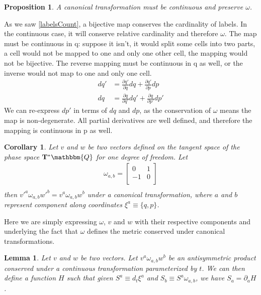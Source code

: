 \documentclass[aps,pra,10pt,twocolumn,floatfix,nofootinbib]{revtex4-1}
\newtheorem{cor}[thm]{Corollary}
\newtheorem{lem}[thm]{Lemma}
\newtheorem{prop}[thm]{Proposition}
\theoremstyle{definition}
\begin{document}
\begin{prop}\label{continuousMapping}
A canonical transformation must be continuous and preserve $\omega$.
\end{prop}

As we saw \ref{labelsCount}, a bijective map conserves the cardinality of labels. In the continuous case, it will conserve relative cardinality and therefore $\omega$. The map must be continuous in q: suppose it isn't, it would split some cells into two parts, a cell would not be mapped to one and only one other cell, the mapping would not be bijective. The reverse mapping must be continuous in q as well, or the inverse would not map to one and only one cell.
\begin{align*}
dq' &= \frac{\partial q'}{\partial q} dq + \frac{\partial q'}{\partial p} dp \\
dq &= \frac{\partial q}{\partial q'} dq' + \frac{\partial q}{\partial p'} dp'
\end{align*}
We can re-express $dp'$ in terms of $dq$ and $dp$, as the conservation of $\omega$ means the map is non-degenerate. All partial derivatives are well defined, and therefore the mapping is continuous in p as well.

\begin{cor}\label{sdofInvariant}
Let $v$ and $w$ be two vectors defined on the tangent space of the phase space $\mathbf{T}^*\mathbbm{Q}$ for one degree of freedom. Let
\begin{align*}
\omega_{a, b} = \left[
  \begin{array}{cc}
    0 & 1 \\
    -1 & 0 \\
  \end{array}
\right] \\
\end{align*}
then $v'^{a} \omega_{a, b} w'^{b}=v^{a} \omega_{a, b} w^{b}$ under a canonical transformation, where $a$ and $b$ represent component along coordinates $\xi^{a} \equiv \{q,p\}$.
\end{cor}

Here we are simply expressing $\omega$, $v$ and $w$ with their respective components and underlying the fact that $\omega$ defines the metric conserved under canonical transformations.

\begin{lem}\label{genAntisim}
Let $v$ and $w$ be two vectors. Let $v^{a} \omega_{a, b} w^{b}$ be an antisymmetric product conserved under a continuous transformation parameterized by $t$. We can then define a function $H$ such that given $S^{a} \equiv d_{t}\xi^{a}$ and $S_{b} \equiv S^{a} \omega_{a, b}$, we have $S_{a} = \partial_{a}H$.
\end{lem}
\end{document}
